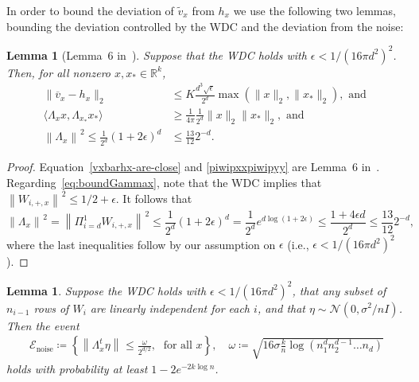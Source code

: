 \documentclass[11pt]{article}
\newtheorem{lemma}[theorem]{Lemma}
\newcommand{\R}{\mathbb{R}}
\newcommand{\eps}{\epsilon}
\newcommand{\xo}{x_\ast}
\newcommand{\PiWd}{\Pi_{i=d}^1 W_{i,+,x}}
\newcommand{\vbarx}{\overline{v}_{x}}
\newcommand{\hx}{h_x}
\newcommand\defeq{\coloneqq}
\newcommand{\Tnorm}{}
\newcommand\norm[2][\Tnorm]{\ensuremath{{\left\|#2\right\|}_{#1}}}
\newcommand\eventnoisesmall{\mathcal E_{\text{noise}}}
\newcommand\stepdir[1]{\tilde v_{#1}}
\begin{document}
In order to bound the deviation of $\stepdir{x}$ from $h_x$ we use the following two lemmas, bounding the deviation controlled by the WDC and the deviation from the noise:

\begin{lemma}[Lemma~6 in~\citep{hand_global_2017}]
\label{lemma:vxbarhx}
Suppose that the WDC holds with $\eps < 1/(16 \pi d^2)^2$. Then, for all nonzero $x, \xo \in \R^k$,
\begin{align}
\| \vbarx - \hx \|_2 &\leq K \frac{d^3 \sqrt{\eps}}{2^d} \max ( \|x\|_2, \| \xo\|_2), \text{ and } \label{vxbarhx-are-close} \\
\bigl \langle  \Lambda_x x, \Lambda_{\xo} \xo \bigr \rangle  &\geq \frac{1}{4 \pi} \frac{1}{2^d} \|x\|_2 \|\xo\|_2, \text{ and } \label{piwipxxpiwipyy} \\
%
\norm{ \Lambda_x }^2 \leq \frac{1}{2^d} (1 + 2 \eps)^d
&\leq
\frac{13}{12} 2^{-d}.
\label{eq:boundGammax}
\end{align}
\end{lemma}
\begin{proof}
Equation~\eqref{vxbarhx-are-close} and \eqref{piwipxxpiwipyy} are Lemma~6 in~\citep{hand_global_2017}.
Regarding~\eqref{eq:boundGammax}, note that the WDC implies that $\norm{W_{i,+,x}}^2 \leq 1/2 + \epsilon$.
It follows that
\[
\norm{\Lambda_x}^2
=
\norm{\PiWd}^2 \leq \frac{1}{2^d} (1 + 2 \eps)^d
= \frac{1}{2^d} e^{d \log(1+2 \eps)} \leq \frac{1 + 4 \eps d}{2^d}
\leq
\frac{13}{12} 2^{-d},
\]
where the last inequalities follow by our assumption on $\epsilon$ (i.e., $\eps < 1/(16 \pi d^2)^2$).
\end{proof}


\begin{lemma}
\label{lem:noisesmall}
Suppose the WDC holds with $\eps < 1/(16 \pi d^2)^2$, that any subset of $n_{i-1}$ rows of $W_i$ are linearly independent for each $i$,  and that $\eta \sim \mathcal N(0, \sigma^2/ n I)$.
Then the event
\begin{align}
\label{eq:qnoiseb}
\eventnoisesmall
\defeq
\left\{
\norm{ \Lambda_x^t \eta }
\leq
\frac{\omega}{2^{d/2}},
\; \text{ for all $x$}
\right\},
\quad
\omega
\defeq
\sqrt{ 16 \sigma \frac{k}{n}
\log(n_1^d n_2^{d-1}\ldots n_d)}
\end{align}
holds with probability at least $1-2e^{-2 k \log n}$.
\end{lemma}
\end{document}
